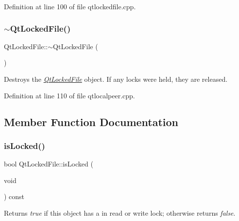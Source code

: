 Definition at line 100 of file qtlockedfile.\+cpp.

\mbox{\label{class_qt_l_p___private_1_1_qt_locked_file_ae22e087171c094da6cfb3282e838c9d4}} 
\subsubsection{\texorpdfstring{$\sim$\+Qt\+Locked\+File()}{~QtLockedFile()}}
{\footnotesize\ttfamily Qt\+Locked\+File\+::$\sim$\+Qt\+Locked\+File (\begin{DoxyParamCaption}{ }\end{DoxyParamCaption})}

Destroys the {\itshape \hyperlink{class_qt_l_p___private_1_1_qt_locked_file}{Qt\+Locked\+File}} object. If any locks were held, they are released. 

Definition at line 110 of file qtlocalpeer.\+cpp.



\subsection{Member Function Documentation}
\mbox{\label{class_qt_l_p___private_1_1_qt_locked_file_a0800b8ae9f4d268fe6968b9075f64bb3}} 
\subsubsection{\texorpdfstring{is\+Locked()}{isLocked()}}
{\footnotesize\ttfamily bool Qt\+Locked\+File\+::is\+Locked (\begin{DoxyParamCaption}\item[{void}]{ }\end{DoxyParamCaption}) const}

Returns {\itshape true} if this object has a in read or write lock; otherwise returns {\itshape false}.

